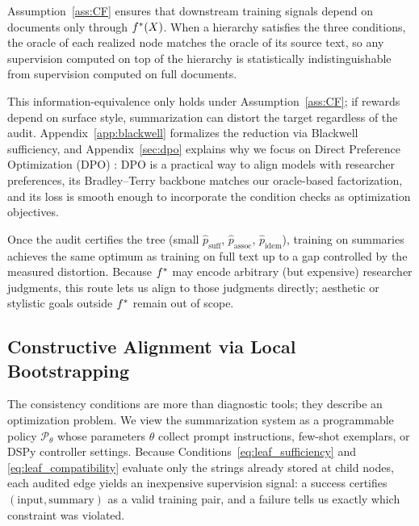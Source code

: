 Assumption~\ref{ass:CF} ensures that downstream training signals depend on documents only through $f^{\ast}(X)$. When a hierarchy satisfies the three conditions, the oracle of each realized node matches the oracle of its source text, so any supervision computed on top of the hierarchy is statistically indistinguishable from supervision computed on full documents.

This information-equivalence only holds under Assumption~\ref{ass:CF}; if rewards depend on surface style, summarization can distort the target regardless of the audit. Appendix~\ref{app:blackwell} formalizes the reduction via Blackwell sufficiency, and Appendix~\ref{sec:dpo} explains why we focus on Direct Preference Optimization (DPO) \citep{RafailovEtAl2023DPO}: DPO is a practical way to align models with researcher preferences, its Bradley--Terry backbone matches our oracle-based factorization, and its loss is smooth enough to incorporate the condition checks as optimization objectives.

Once the audit certifies the tree (small $\hat{p}_{\text{suff}}$, $\hat{p}_{\text{assoc}}$, $\hat{p}_{\text{idem}}$), training on summaries achieves the same optimum as training on full text up to a gap controlled by the measured distortion. Because $f^{\ast}$ may encode arbitrary (but expensive) researcher judgments, this route lets us align to those judgments directly; aesthetic or stylistic goals outside $f^{\ast}$ remain out of scope.

\subsection{Constructive Alignment via Local Bootstrapping}\label{sec:bootstrap-main}

The consistency conditions are more than diagnostic tools; they describe an optimization problem. We view the summarization system as a programmable policy $\mathcal{P}_\theta$ whose parameters $\theta$ collect prompt instructions, few-shot exemplars, or DSPy controller settings. Because Conditions~\eqref{eq:leaf_sufficiency} and \eqref{eq:leaf_compatibility} evaluate only the strings already stored at child nodes, each audited edge yields an inexpensive supervision signal: a success certifies $(\text{input}, \text{summary})$ as a valid training pair, and a failure tells us exactly which constraint was violated.

